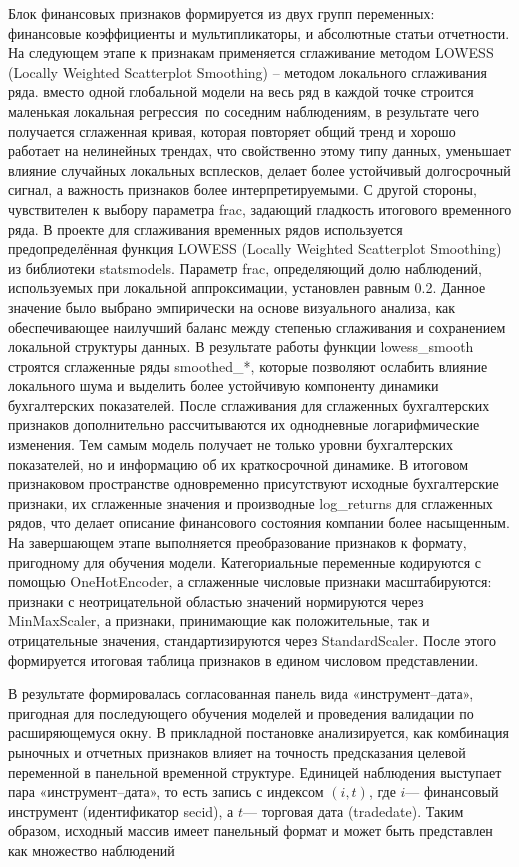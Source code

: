 \documentclass[
]{article}
\begin{document}
Блок финансовых признаков формируется из двух групп переменных: финансовые коэффициенты и мультипликаторы, и абсолютные статьи отчетности. На следующем этапе к признакам применяется сглаживание методом LOWESS (Locally Weighted Scatterplot Smoothing) -- методом локального сглаживания ряда. вместо одной глобальной модели на весь ряд в каждой точке строится маленькая локальная регрессия~по соседним наблюдениям, в результате чего получается сглаженная кривая, которая повторяет общий тренд и хорошо работает на нелинейных трендах, что свойственно этому типу данных, уменьшает влияние случайных локальных всплесков, делает более устойчивый долгосрочный сигнал, а важность признаков более интерпретируемыми. С другой стороны, чувствителен к выбору параметра frac, задающий гладкость итогового временного ряда. В проекте для сглаживания временных рядов используется предопределённая функция LOWESS (Locally Weighted Scatterplot Smoothing) из библиотеки statsmodels. Параметр frac, определяющий долю наблюдений, используемых при локальной аппроксимации, установлен равным 0.2. Данное значение было выбрано эмпирически на основе визуального анализа, как обеспечивающее наилучший баланс между степенью сглаживания и сохранением локальной структуры данных. В результате работы функции lowess\_smooth строятся сглаженные ряды smoothed\_*, которые позволяют ослабить влияние локального шума и выделить более устойчивую компоненту динамики бухгалтерских показателей. После сглаживания для сглаженных бухгалтерских признаков дополнительно рассчитываются их однодневные логарифмические изменения. Тем самым модель получает не только уровни бухгалтерских показателей, но и информацию об их краткосрочной динамике. В итоговом признаковом пространстве одновременно присутствуют исходные бухгалтерские признаки, их сглаженные значения и производные log\_returns для сглаженных рядов, что делает описание финансового состояния компании более насыщенным. На завершающем этапе выполняется преобразование признаков к формату, пригодному для обучения модели. Категориальные переменные кодируются с помощью OneHotEncoder, а сглаженные числовые признаки масштабируются: признаки с неотрицательной областью значений нормируются через MinMaxScaler, а признаки, принимающие как положительные, так и отрицательные значения, стандартизируются через StandardScaler. После этого формируется итоговая таблица признаков в едином числовом представлении.

В результате формировалась согласованная панель вида «инструмент--дата», пригодная для последующего обучения моделей и проведения валидации по расширяющемуся окну. В прикладной постановке анализируется, как комбинация рыночных и отчетных признаков влияет на точность предсказания целевой переменной в панельной временной структуре. Единицей наблюдения выступает пара «инструмент--дата», то есть запись с индексом \(\left( i,t \right)\), где \(i\)--- финансовый инструмент (идентификатор secid), а \(t\)--- торговая дата (tradedate). Таким образом, исходный массив имеет панельный формат и может быть представлен как множество наблюдений
\end{document}
